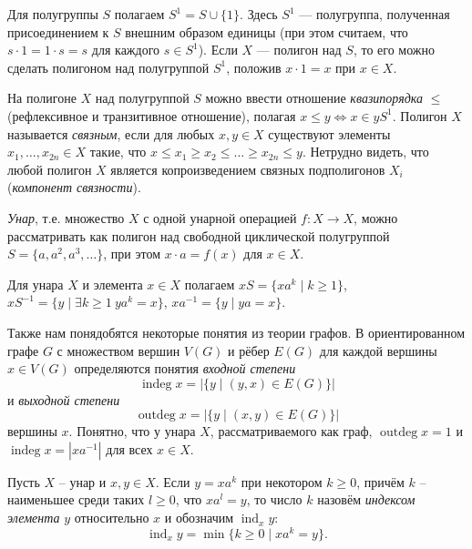 \documentclass[11pt,twoside,draft
]{article}
\def\indeg{\operatorname{indeg}}
\def\outdeg{\operatorname{outdeg}}
\def\ind{\operatorname{ind}}
\begin{document}
Для полугруппы $S$ полагаем $S^1 = S \cup \{ 1 \}$.
Здесь $S^1$ — полугруппа, полученная присоединением к $S$ внешним образом единицы (при этом считаем, что $s \cdot 1 = 1 \cdot s = s$ для каждого $s \in S^1$).
Если $X$ — полигон над $S$, то его можно сделать полигоном над полугруппой $S^1$, положив $x \cdot 1 = x$ при $x \in X$.

На полигоне $X$ над полугруппой $S$ можно ввести отношение \textit{квазипорядка} $\leqslant$ (рефлексивное и транзитивное отношение), полагая $x \leqslant y \Leftrightarrow x \in yS^1$.
Полигон $X$ называется \textit{связным}, если для любых $x,y \in X$ существуют элементы $x_1,\ldots,x_{2n} \in X$ такие, что  $ x \leqslant x_1 \geqslant x_2 \leqslant \ldots \geqslant x_{2n} \leqslant y$.
Нетрудно видеть, что любой полигон $X$ является копроизведением связных подполигонов $X_i$ (\textit{компонент связности}).

\textit{Унар}, т.е. множество $X$ с одной унарной операцией $f: X \to X$, можно рассматривать как полигон над свободной циклической полугруппой $S = \{ a,a^{2},a^{3},\ldots\}$, при этом $x \cdot a = f(x)$ для $x \in X$.

Для унара $X$ и элемента $x \in X$ полагаем $xS = \{ xa^k \mid k \geqslant 1 \}$, $xS^{-1} = \{ y \mid \exists k \geqslant 1 \ y a^k = x \}$, $xa^{-1} = \{ y \mid ya = x \}$.

Также нам понядобятся некоторые понятия из теории графов.
В ориентированном графе $G$ с множеством вершин $V(G)$ и рёбер $E(G)$ для каждой вершины $x \in V(G)$ определяются понятия \textit{входной степени}
\[
	\indeg x = |\{ y \mid (y,x) \in E(G) \}|
\]
и \textit{выходной степени}
\[
	\outdeg x = |\{ y \mid (x,y) \in E(G) \}|
\]
вершины $x$.
Понятно, что у унара $X$, рассматриваемого как граф, $\outdeg x = 1$ и $\indeg x = |xa^{-1}|$ для всех $x \in X$.

Пусть $X$ -- унар и $x,y \in X$. Если $y = x a^k$ при некотором $k \geqslant 0$, причём $k$ -- наименьшее среди таких $l \geqslant 0$, что $x a^l = y$, то число $k$ назовём \textit{индексом элемента} $y$ относительно $x$ и обозначим $\ind_x y$: $$ \ind_x y = \min \{ k \geqslant 0 \mid xa^k = y \}. $$
\end{document}
